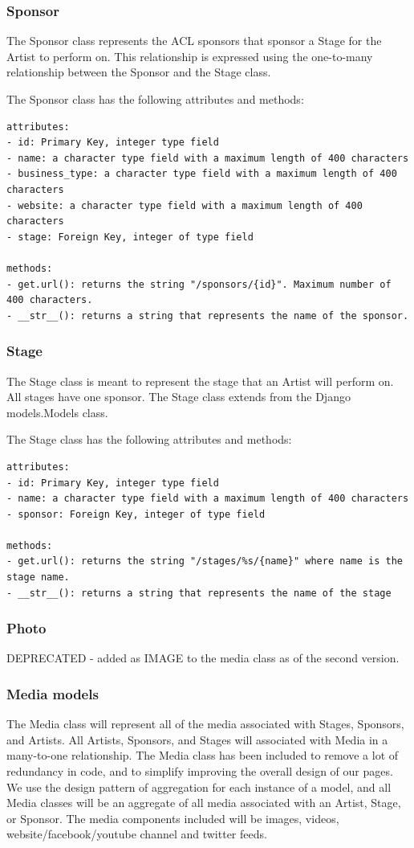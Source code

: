 \documentclass[12pt,english]{scrartcl}
\begin{document}
\subsubsection{Sponsor}
The Sponsor class represents the ACL sponsors that sponsor a Stage for the Artist to perform on.
This relationship is expressed using the one-to-many relationship between the Sponsor and the Stage
class. 

The Sponsor class has the following attributes and methods:
\begin{verbatim}
attributes:
- id: Primary Key, integer type field
- name: a character type field with a maximum length of 400 characters
- business_type: a character type field with a maximum length of 400 characters
- website: a character type field with a maximum length of 400 characters
- stage: Foreign Key, integer of type field

methods:
- get.url(): returns the string "/sponsors/{id}". Maximum number of 400 characters.
- __str__(): returns a string that represents the name of the sponsor.
\end{verbatim}

\subsubsection{Stage}
The Stage class is meant to represent the stage that an Artist will perform on. All stages
have one sponsor. The Stage class extends from the Django models.Models class.

The Stage class has the following attributes and methods:
\begin{verbatim}
attributes:
- id: Primary Key, integer type field
- name: a character type field with a maximum length of 400 characters
- sponsor: Foreign Key, integer of type field

methods:
- get.url(): returns the string "/stages/%s/{name}" where name is the stage name.
- __str__(): returns a string that represents the name of the stage
\end{verbatim}

\subsubsection{Photo}
DEPRECATED - added as IMAGE to the media class as of the second version.

\subsubsection{Media models}
The Media class will represent all of the media associated with Stages, Sponsors, and Artists. All Artists, Sponsors, and Stages will associated
with Media in a many-to-one relationship. The Media class has been included to remove a lot of redundancy in code, and to simplify improving the overall 
design of our pages. We use the design pattern of aggregation for each instance of a model, and all Media classes will be an aggregate of all media
associated with an Artist, Stage, or Sponsor. The media components included will be images, videos, website/facebook/youtube channel and twitter feeds.
\end{document}
